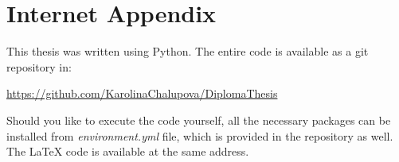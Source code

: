 \chapter{Internet Appendix}

This thesis was written using Python. The entire code is available as a git repository in:   

\url{https://github.com/KarolinaChalupova/DiplomaThesis} 
 

Should you like to execute the code yourself, all the necessary packages can be installed from \textit{environment.yml} file, which is provided in the repository as well. The LaTeX code is available at the same address. 


